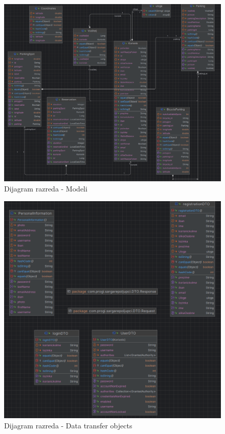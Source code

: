 \begin{figure}[H]
	\includegraphics[width=\textwidth]{slike/models.png} %
	\centering
	\caption{Dijagram razreda - Modeli}
\end{figure}

\begin{figure}[H]
	\includegraphics[width=\textwidth]{slike/dto.png} %
	\centering
	\caption{Dijagram razreda - Data transfer objects}
	\label{fig:dijagramrazreda2}
\end{figure}




